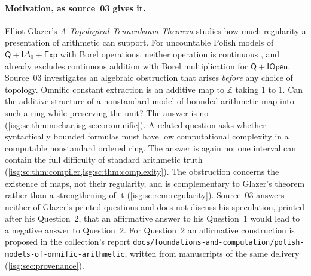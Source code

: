 \documentclass[11pt]{article}
\theoremstyle{definition}
\theoremstyle{remark}
\newcommand{\Z}{\mathbb{Z}}
\newcommand{\Iopen}{\mathsf{IOpen}}
\newcommand{\Idelta}{\mathsf{I}\Delta_0}
\begin{document}
\paragraph{Motivation, as source~03 gives it.} Elliot Glazer's
\emph{A Topological Tennenbaum Theorem} \cite{Glazer} studies how much
regularity a presentation of arithmetic can support. For uncountable
Polish models of $\mathsf Q+\Idelta+\mathsf{Exp}$ with Borel operations,
neither operation is continuous \cite[Theorem~2]{Glazer}, and
\cite[Corollary~1]{Glazer} already excludes continuous addition with
Borel multiplication for $\mathsf Q+\Iopen$. Source~03 investigates an
algebraic obstruction that arises \emph{before} any choice of topology.
Omnific constant extraction is an additive map to $\Z$ taking $1$ to $1$.
Can the additive structure of a nonstandard model of bounded arithmetic
map into such a ring while preserving the unit? The answer is no
(\cref{isg:sc:thm:nochar,isg:sc:cor:omnific}). A related question asks
whether syntactically bounded formulas must have low computational
complexity in a computable nonstandard ordered ring. The answer is again
no: one interval can contain the full difficulty of standard arithmetic
truth (\cref{isg:sc:thm:compiler,isg:sc:thm:complexity}). The
obstruction concerns the existence of maps, not their regularity, and is
complementary to Glazer's theorem rather than a strengthening of it
(\cref{isg:sc:rem:regularity}). Source~03 answers neither of Glazer's
printed questions and does not discuss his speculation, printed after his
Question~2, that an affirmative answer to his Question~1 would lead to a
negative answer to Question~2. For Question~2 an affirmative construction
is proposed in the collection's report
\nolinkurl{docs/foundations-and-computation/polish-models-of-omnific-arithmetic},
written from manuscripts of the same delivery (\cref{isg:sec:provenance}).
\end{document}
